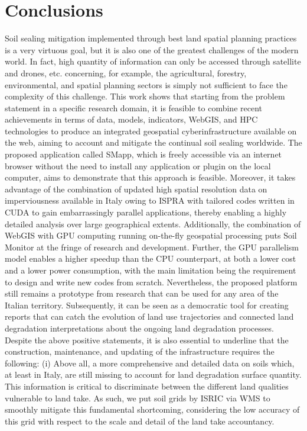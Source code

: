 \documentclass[APA,LATO1COL,doublespace]{WileyNJD-v2}
\begin{document}
\section{Conclusions}
Soil sealing mitigation implemented through best land spatial planning practices is a very virtuous goal, but it is also one of the greatest challenges of the modern world. In fact, high quantity of information can only be accessed through satellite and drones, etc. concerning, for example, the agricultural, forestry, environmental, and spatial planning sectors is simply not sufficient to face the complexity of this challenge.
This work shows that starting from the problem statement in a specific research domain, it is feasible to combine recent achievements in terms of data, models, indicators, WebGIS, and HPC technologies to produce an integrated geospatial cyberinfrastructure available on the web, aiming to account and mitigate the continual soil sealing worldwide. The proposed application called SMapp, which is freely accessible via an internet browser without the need to install any application or plugin on the local computer, aims to demonstrate that this approach is feasible. Moreover, it takes advantage of the combination of updated high spatial resolution data on imperviousness available in Italy owing to ISPRA with tailored codes written in CUDA to gain embarrassingly parallel applications, thereby enabling a highly detailed analysis over large geographical extents. Additionally, the combination of WebGIS with GPU computing running on-the-fly geospatial processing puts Soil Monitor at the fringe of research and development. Further, the GPU parallelism model enables a higher speedup than the CPU counterpart, at both a lower cost and a lower power consumption, with the main limitation being the requirement to design and write new codes from scratch.
Nevertheless, the proposed platform still remains a prototype from research that can be used for any area of the Italian territory. Subsequently, it can be seen as a democratic tool for creating reports that can catch the evolution of land use trajectories and connected land degradation interpretations about the ongoing land degradation processes.
Despite the above positive statements, it is also essential to underline that the construction, maintenance, and updating of the infrastructure requires the following:
(i)	Above all, a more comprehensive and detailed data on soils which, at least in Italy, are still missing to account for land degradation surface quantity. This information is critical to discriminate between the different land qualities vulnerable to land take. As such, we put soil grids by ISRIC via WMS to smoothly mitigate this fundamental shortcoming, considering the low accuracy of this grid with respect to the scale and detail of the land take accountancy.
\end{document}
